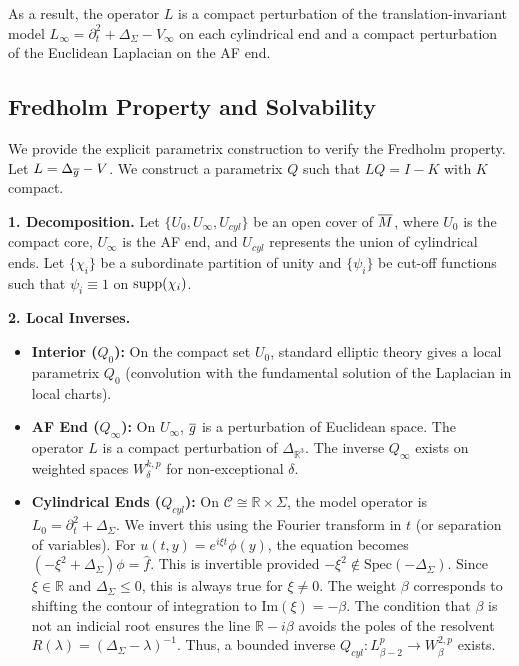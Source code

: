As a result, the operator $L$ is a compact perturbation of the translation-invariant model $L_\infty = \partial_t^2 + \Delta_\Sigma - V_\infty$ on each cylindrical end and a compact perturbation of the Euclidean Laplacian on the AF end.

\subsection{Fredholm Property and Solvability}

We provide the explicit parametrix construction to verify the Fredholm property.
Let $L = \Delta_{\overline{g}} - V$. We construct a parametrix $Q$ such that $LQ = I - K$ with $K$ compact.

\textbf{1. Decomposition.}
Let $\{U_0, U_\infty, U_{cyl}\}$ be an open cover of $\overline{M}$, where $U_0$ is the compact core, $U_\infty$ is the AF end, and $U_{cyl}$ represents the union of cylindrical ends. Let $\{\chi_i\}$ be a subordinate partition of unity and $\{\psi_i\}$ be cut-off functions such that $\psi_i \equiv 1$ on $\mathrm{supp}(\chi_i)$.

\textbf{2. Local Inverses.}
\begin{itemize}
    \item \textbf{Interior ($Q_0$):} On the compact set $U_0$, standard elliptic theory gives a local parametrix $Q_0$ (convolution with the fundamental solution of the Laplacian in local charts).
    \item \textbf{AF End ($Q_\infty$):} On $U_\infty$, $\overline{g}$ is a perturbation of Euclidean space. The operator $L$ is a compact perturbation of $\Delta_{\mathbb{R}^3}$. The inverse $Q_\infty$ exists on weighted spaces $W^{k,p}_\delta$ for non-exceptional $\delta$.
    \item \textbf{Cylindrical Ends ($Q_{cyl}$):} On $\mathcal{C} \cong \mathbb{R} \times \Sigma$, the model operator is $L_0 = \partial_t^2 + \Delta_\Sigma$. We invert this using the Fourier transform in $t$ (or separation of variables).
    For $u(t,y) = e^{i\xi t} \phi(y)$, the equation becomes $(-\xi^2 + \Delta_\Sigma)\phi = \hat{f}$.
    This is invertible provided $-\xi^2 \notin \text{Spec}(-\Delta_\Sigma)$. Since $\xi \in \mathbb{R}$ and $\Delta_\Sigma \le 0$, this is always true for $\xi \neq 0$. The weight $\beta$ corresponds to shifting the contour of integration to $\text{Im}(\xi) = -\beta$. The condition that $\beta$ is not an indicial root ensures the line $\mathbb{R} - i\beta$ avoids the poles of the resolvent $R(\lambda) = (\Delta_\Sigma - \lambda)^{-1}$.
    Thus, a bounded inverse $Q_{cyl}: L^p_{\beta-2} \to W^{2,p}_{\beta}$ exists.
\end{itemize}

